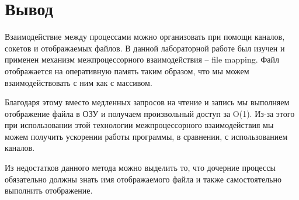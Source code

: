 \documentclass[pdf, unicode, 12pt, a4paper,oneside,fleqn]{article}
\begin{document}
\pagebreak

\section{Вывод}

Взаимодействие между процессами можно организовать при помощи каналов, сокетов и отображаемых
файлов. В данной лабораторной работе был изучен и применен механизм межпроцессорного взаимодействия 
\--- file mapping. Файл отображается на оперативную память таким образом, что мы можем взаимодействовать
с ним как с массивом.

Благодаря этому вместо медленных запросов на чтение и запись мы выполняем отображение файла в
ОЗУ и получаем произвольный доступ за O(1). Из-за этого при использовании этой технологии межпроцессорного
взаимодействия мы можем получить ускорении работы программы, в сравнении, с использованием каналов.

Из недостатков данного метода можно выделить то, что дочерние процессы обязательно должны знать
имя отображаемого файла и также самостоятельно выполнить отображение.
\end{document}
